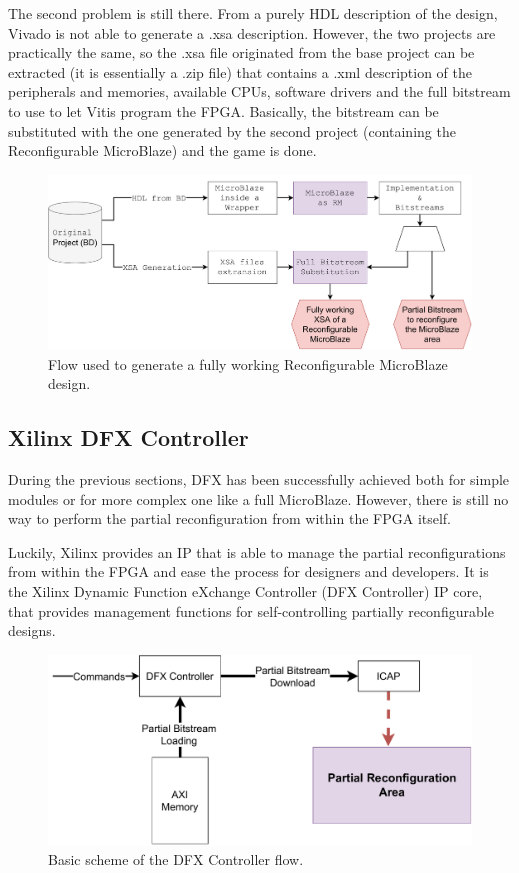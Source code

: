 The second problem is still there. From a purely HDL description of the design, Vivado is not able to generate a .xsa description. However, the two projects are practically the same, so the .xsa file originated from the base project can be extracted (it is essentially a .zip file) that contains a .xml description of the peripherals and memories, available CPUs, software drivers and the full bitstream to use to let Vitis program the FPGA. Basically, the bitstream can be substituted with the one generated by the second project (containing the Reconfigurable MicroBlaze) and the game is done.

\begin{figure}[H]
\centering
\includegraphics[width=1.0\linewidth]{images/chapter4/mystic_flow.pdf}
\caption{Flow used to generate a fully working Reconfigurable MicroBlaze design.}
\label{fig:mystic_flow}
\end{figure}

\subsection{Xilinx DFX Controller}
During the previous sections, DFX has been successfully achieved both for simple modules or for more complex one like a full MicroBlaze. However, there is still no way to perform the partial reconfiguration from within the FPGA itself. \bigskip

Luckily, Xilinx provides an IP that is able to manage the partial reconfigurations from within the FPGA and ease the process for designers and developers. It is the Xilinx Dynamic Function eXchange Controller (DFX Controller) IP core, that provides management functions for self-controlling partially reconfigurable designs. \bigskip

\begin{figure}[H]
\centering
\includegraphics[width=0.9\linewidth]{images/chapter4/dfxc.pdf}
\caption{Basic scheme of the DFX Controller flow.}
\end{figure}

